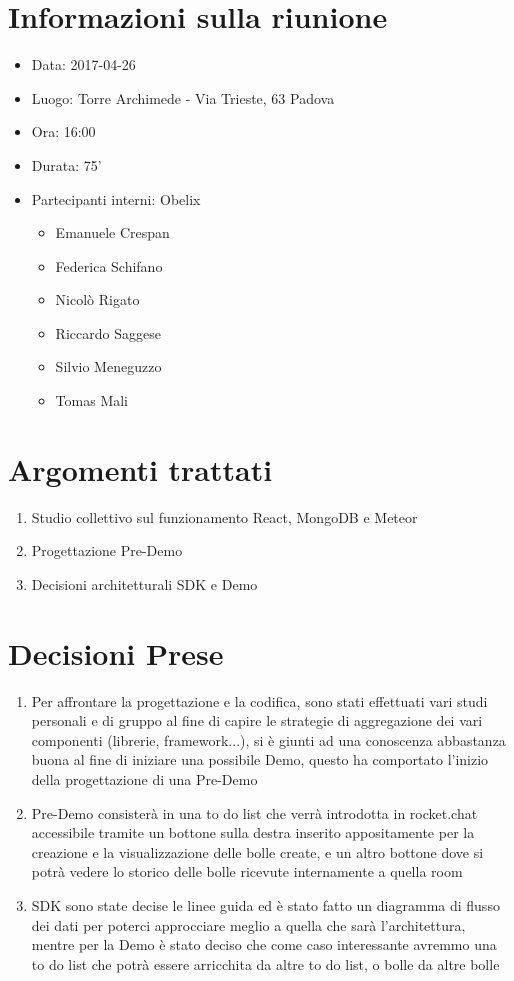 \documentclass[10 pt,a4paper, openany]{article}
\date{}
\begin{document}
\paginatitolo
\section{Informazioni sulla riunione}

\begin{itemize}
\item[] Data: 2017-04-26
\item[] Luogo: Torre Archimede - Via Trieste, 63 Padova
\item[] Ora: 16:00
\item[] Durata: 75'
\item[] Partecipanti interni: Obelix
  \begin{itemize}
  \item[] Emanuele Crespan
  \item[] Federica Schifano
  \item[] Nicolò Rigato
  \item[] Riccardo Saggese
  \item[] Silvio Meneguzzo
  \item[] Tomas Mali
 \end{itemize}
\end{itemize}

\section{Argomenti trattati}
\begin{enumerate}
	\item Studio collettivo sul funzionamento React, MongoDB e Meteor	
	\item Progettazione Pre-Demo
	\item Decisioni architetturali SDK e Demo

	
\end{enumerate}


\section{Decisioni Prese}
\begin{enumerate}
	\item Per affrontare la progettazione e la codifica, sono stati effettuati vari studi personali e di gruppo al fine di capire le strategie di aggregazione dei vari componenti (librerie, framework...), si è giunti ad una conoscenza abbastanza buona al fine di iniziare una possibile Demo, questo ha comportato l'inizio della progettazione di una Pre-Demo
	\item Pre-Demo consisterà in una to do list che verrà introdotta in rocket.chat accessibile tramite un bottone sulla destra inserito appositamente per la creazione e la visualizzazione delle bolle create, e un altro bottone dove si potrà vedere lo storico delle bolle ricevute internamente a quella room
	\item SDK sono state decise le linee guida ed è stato fatto un diagramma di flusso dei dati per poterci approcciare meglio a quella che sarà l'architettura, mentre per la Demo è stato deciso che come caso interessante avremmo una to do list che potrà essere arricchita da altre to do list, o bolle da altre bolle
\end{enumerate}
\end{document}
